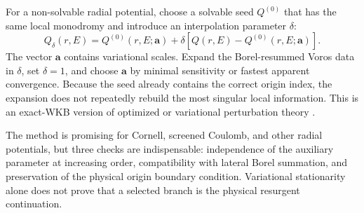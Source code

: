 For a non-solvable radial potential, choose a solvable seed $Q^{(0)}$ that has
the same local monodromy and introduce an interpolation parameter $\delta$:
\begin{equation}
  Q_{\delta}(r,E)
  =Q^{(0)}(r,E;\bm a)
  +\delta\left[Q(r,E)-Q^{(0)}(r,E;\bm a)\right] .
  \label{eq:delta-interpolation}
\end{equation}
The vector $\bm a$ contains variational scales.  Expand the Borel-resummed
Voros data in $\delta$, set $\delta=1$, and choose $\bm a$ by minimal
sensitivity or fastest apparent convergence.  Because the seed already
contains the correct origin index, the expansion does not repeatedly rebuild
the most singular local information.  This is an exact-WKB version of
optimized or variational perturbation theory
\cite{Stevenson:1981vj,Duncan:1992ba,Buckley:1992pc,
Kleinert:1995hc,Zinn-Justin:2010zzb}.

The method is promising for Cornell, screened Coulomb, and other radial
potentials, but three checks are indispensable: independence of the auxiliary
parameter at increasing order, compatibility with lateral Borel summation,
and preservation of the physical origin boundary condition.  Variational
  stationarity alone does not prove that a selected branch is the physical
  resurgent continuation.
